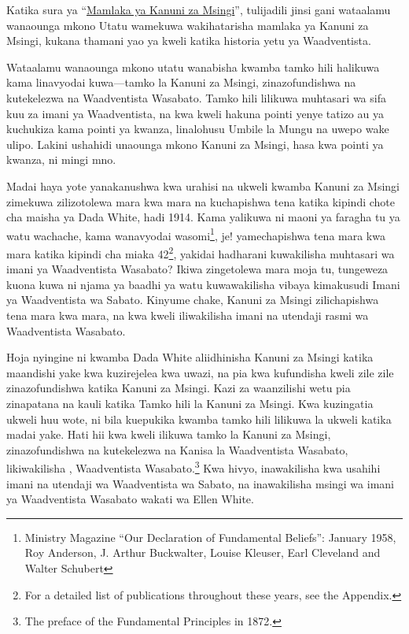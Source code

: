 Katika sura ya “\hyperref[chap:authority]{Mamlaka ya Kanuni za Msingi}”, tulijadili jinsi gani wataalamu wanaounga mkono Utatu wamekuwa wakihatarisha mamlaka ya Kanuni za Msingi, kukana thamani yao ya kweli katika historia yetu ya Waadventista.


Wataalamu wanaounga mkono utatu wanabisha kwamba tamko hili halikuwa kama linavyodai kuwa—tamko la Kanuni za Msingi, zinazofundishwa na kutekelezwa na Waadventista Wasabato. Tamko hili lilikuwa muhtasari wa sifa kuu za imani ya Waadventista, na kwa kweli hakuna pointi yenye tatizo au ya kuchukiza kama pointi ya kwanza, linalohusu Umbile la Mungu na uwepo wake ulipo. Lakini ushahidi unaounga mkono Kanuni za Msingi, hasa kwa pointi ya kwanza, ni mingi mno.


Madai haya yote yanakanushwa kwa urahisi na ukweli kwamba Kanuni za Msingi zimekuwa zilizotolewa mara kwa mara na kuchapishwa tena katika kipindi chote cha maisha ya Dada White, hadi 1914. Kama yalikuwa ni maoni ya faragha tu ya watu wachache, kama wanavyodai wasomi\footnote{Ministry Magazine “Our Declaration of Fundamental Beliefs”: January 1958, Roy Anderson, J. Arthur Buckwalter, Louise Kleuser, Earl Cleveland and Walter Schubert}, je! yamechapishwa tena mara kwa mara katika kipindi cha miaka 42\footnote{For a detailed list of publications throughout these years, see the Appendix.}, yakidai hadharani kuwakilisha muhtasari wa imani ya Waadventista Wasabato? Ikiwa zingetolewa mara moja tu, tungeweza kuona kuwa ni njama ya baadhi ya watu kuwawakilisha vibaya kimakusudi Imani ya Waadventista wa Sabato. Kinyume chake, Kanuni za Msingi zilichapishwa tena mara kwa mara, na kwa kweli iliwakilisha imani na utendaji rasmi wa Waadventista Wasabato.


Hoja nyingine ni kwamba Dada White aliidhinisha Kanuni za Msingi katika maandishi yake kwa kuzirejelea kwa uwazi, na pia kwa kufundisha kweli zile zile zinazofundishwa katika Kanuni za Msingi. Kazi za waanzilishi wetu pia zinapatana na kauli katika Tamko hili la Kanuni za Msingi. Kwa kuzingatia ukweli huu wote, ni bila kuepukika kwamba tamko hili lilikuwa la ukweli katika madai yake. Hati hii kwa kweli ilikuwa tamko la Kanuni za Msingi, zinazofundishwa na kutekelezwa na Kanisa la Waadventista Wasabato, likiwakilisha ,  Waadventista Wasabato.\footnote{The preface of the Fundamental Principles in 1872.} Kwa hivyo, inawakilisha kwa usahihi imani na utendaji wa Waadventista wa Sabato, na inawakilisha msingi wa imani ya Waadventista Wasabato wakati wa Ellen White.


